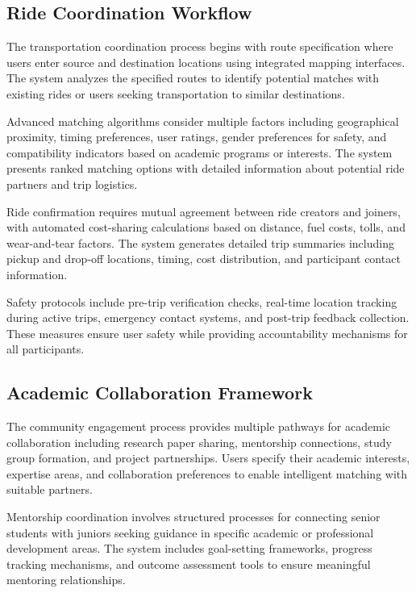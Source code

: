 \documentclass[conference]{IEEEtran}
\begin{document}
\subsection{Ride Coordination Workflow}

The transportation coordination process begins with route specification where users enter source and destination locations using integrated mapping interfaces. The system analyzes the specified routes to identify potential matches with existing rides or users seeking transportation to similar destinations.

Advanced matching algorithms consider multiple factors including geographical proximity, timing preferences, user ratings, gender preferences for safety, and compatibility indicators based on academic programs or interests. The system presents ranked matching options with detailed information about potential ride partners and trip logistics.

Ride confirmation requires mutual agreement between ride creators and joiners, with automated cost-sharing calculations based on distance, fuel costs, tolls, and wear-and-tear factors. The system generates detailed trip summaries including pickup and drop-off locations, timing, cost distribution, and participant contact information.

Safety protocols include pre-trip verification checks, real-time location tracking during active trips, emergency contact systems, and post-trip feedback collection. These measures ensure user safety while providing accountability mechanisms for all participants.

\subsection{Academic Collaboration Framework}

The community engagement process provides multiple pathways for academic collaboration including research paper sharing, mentorship connections, study group formation, and project partnerships. Users specify their academic interests, expertise areas, and collaboration preferences to enable intelligent matching with suitable partners.

Mentorship coordination involves structured processes for connecting senior students with juniors seeking guidance in specific academic or professional development areas. The system includes goal-setting frameworks, progress tracking mechanisms, and outcome assessment tools to ensure meaningful mentoring relationships.
\end{document}
